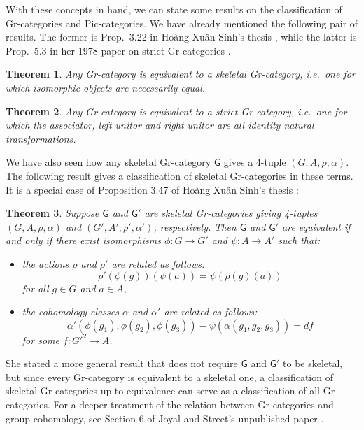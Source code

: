 \documentclass[reqno]{amsart}
\newcommand{\maps}{\colon}    %
\newcommand{\G}{{\mathsf{G}}}   %
\newtheorem{thm}{Theorem}
\theoremstyle{definition}
\begin{document}
With these concepts in hand, we can state some results on the classification of Gr-categories and Pic-categories.   We have already mentioned the following pair of results.  The former is Prop.\ 3.22 in Ho\`ang Xu\^an S\'inh's thesis \cite{H73}, while the latter is Prop.\ 5.3 in her 1978 paper on strict Gr-categories \cite{H78}.

\begin{thm}
\label{thm:Gr1}
Any Gr-category is equivalent to a skeletal Gr-category, i.e.\ one for which
isomorphic objects are necessarily equal.
\end{thm}

\begin{thm}
\label{thm:Gr3}
Any Gr-category is equivalent to a strict Gr-category, i.e.\ one for which the associator, left unitor and right unitor are all identity natural transformations.
\end{thm}

We have also seen how any skeletal Gr-category $\G$ gives a 4-tuple $(G,A,\rho,\alpha)$.  The following result gives a classification of skeletal Gr-categories in these terms.  It is a special case of Proposition 3.47 of Ho\`ang Xu\^an S\'inh's thesis \cite{H73}:

\begin{thm}
\label{thm:Gr2}
Suppose $\G$ and $\G'$ are skeletal Gr-categories giving 4-tuples $(G,A,\rho,\alpha)$ and $(G',A',\rho',\alpha')$, respectively.  Then $\G$ and $\G'$ are equivalent if and only if there exist isomorphisms $\phi \maps G \to G'$ and $\psi \maps A \to A'$ such that:
\begin{itemize}
\item
the actions $\rho$ and $\rho'$ are related as follows:
\[   \rho'(\phi(g))(\psi(a)) = \psi(\rho(g)(a)) \]
for all $g \in G$ and $a \in A$,
\item the cohomology classes $\alpha$ and $\alpha'$ are related as follows:
\[   \alpha'(\phi(g_1),\phi(g_2),\phi(g_3)) - \psi(\alpha(g_1,g_2,g_3)) = df \]
for some $f \maps G'^2 \to A$.
\end{itemize}
\end{thm}
\noindent
She stated a more general result that does not require $\G$ and $\G'$ to be skeletal, but since every Gr-category is equivalent to a skeletal one, a classification of skeletal Gr-categories up to equivalence can serve as a classification of all Gr-categories.   For a deeper treatment of the relation between Gr-categories and group cohomology, see Section 6 of Joyal and Street's unpublished paper \cite{JS86}.
\end{document}
